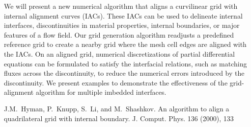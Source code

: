 We will present a new numerical algorithm that aligns a curvilinear
grid with internal alignment curves (IACs).  These IACs can be used to
delineate internal interfaces, discontinuities in material properties,
internal boundaries, or major features of a flow field. Our grid
generation algorithm readjusts a predefined reference grid to create a
nearby grid where the mesh cell edges are aligned with the IACs.  On
an aligned grid, numerical discretizations of partial differential
equations can be formulated to satisfy the interfacial relations, such
as matching fluxes across the discontinuity, to  reduce the numerical
errors introduced by the discontinuity.  We present  examples to
demonstrate the effectiveness of the grid-alignment algorithm for
multiple imbedded interfaces.   



\begin{thebibliography}{10}

{\sc J.M.~Hyman, P.~Knupp, S.~Li, and M.~Shashkov}. {An algorithm to align a
quadrilateral grid with internal boundary}. J. Comput. Phys. 136
(2000),  133


\end{thebibliography}

